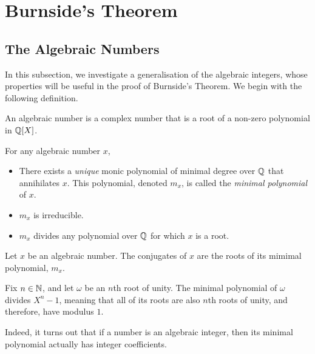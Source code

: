 \section{Burnside's Theorem}

\subsection{The Algebraic Numbers}

In this subsection, we investigate a generalisation of the algebraic integers, whose properties will be useful in the proof of Burnside's Theorem. We begin with the following definition.

\begin{boxdefinition}
    An algebraic number is a complex number that is a root of a non-zero polynomial in $\mathbb{Q}[X]$.
\end{boxdefinition}

\begin{remark} For any algebraic number $x$,
    \begin{itemize}
        \item There exists a \textit{unique} monic polynomial of minimal degree over $\mathbb{Q}$ that annihilates $x$. This polynomial, denoted $m_x$, is called the \textit{minimal polynomial} of $x$.
        \item $m_x$ is irreducible.
        \item $m_x$ divides any polynomial over $\mathbb{Q}$ for which $x$ is a root.
    \end{itemize}
\end{remark}

\begin{definition}
    Let $x$ be an algebraic number. The conjugates of $x$ are the roots of its mimimal polynomial, $m_x$.
\end{definition}

\begin{boxexample}
    Fix $n \in \mathbb{N}$, and let $\omega$ be an $n$th root of unity. The minimal polynomial of $\omega$ divides $X^n - 1$, meaning that all of its roots are also $n$th roots of unity, and therefore, have modulus $1$.
\end{boxexample}

Indeed, it turns out that if a number is an algebraic integer, then its minimal polynomial actually has integer coefficients.


